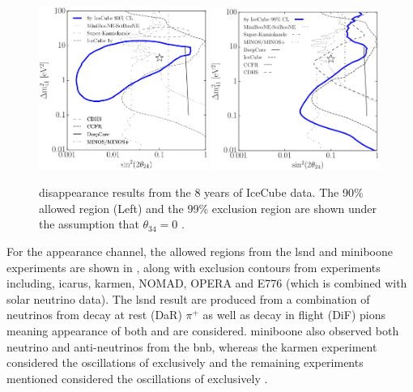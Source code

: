 \begin{figure}[h!]
    \centering
    \includegraphics[width = 0.49\textwidth]{figures-chap6/external_limits/numu_disapp_icecube_90pct.png}
    \includegraphics[width = 0.49\textwidth]{figures-chap6/external_limits/numu_disapp_icecube_99pct.png}
    \caption[\nue disappearance limits from the IceCube experiment.]{\numu disappearance results from the 8 years of IceCube data. The 90\% allowed region (Left) and the 99\% exclusion region are shown under the assumption that $\theta_{34} = 0$ \cite{IceCube_numu_disapp_contour}.}
    \label{fig:icecube}
\end{figure}

For the \nue appearance channel, the allowed regions from the \gls{lsnd} and \gls{miniboone} experiments are shown in , along with exclusion contours from experiments including, \gls{icarus}, \gls{karmen}, NOMAD, OPERA and E776 (which is combined with solar neutrino data)\cite{LSND_excess}\cite{MiniBooNE_nue_app_contour}\cite{icarus_nue_app_contour}\cite{KARMEN_nue_app_contour}\cite{NOMAD}\cite{OPERA}\cite{E776}. The \gls{lsnd} result are produced from a combination of neutrinos from decay at rest (DaR) $\pi^+$ as well as decay in flight (DiF) pions meaning appearance of both \nue and \nuebar are considered. \gls{miniboone} also observed both neutrino and anti-neutrinos from the \gls{bnb}, whereas the \gls{karmen} experiment considered the oscillations of \numubar exclusively and the remaining experiments mentioned considered the oscillations of \numu exclusively \cite{LSND_KARMEN_nue_app_contour}.

